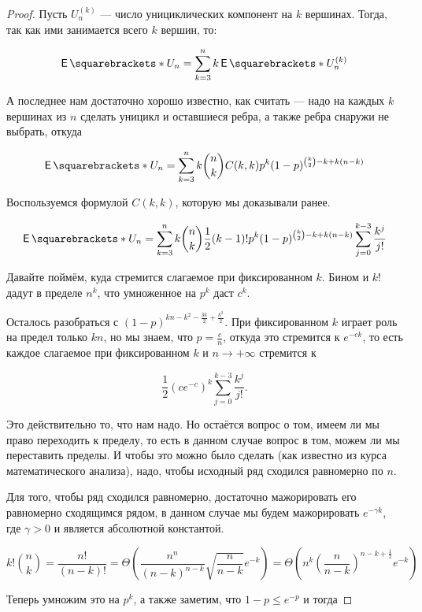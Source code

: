 \begin{proof}
  Пусть $U_n^{(k)}$ --- число унициклических компонент на $k$ вершинах. Тогда, так
  как ими занимается всего $k$ вершин, то:

  \[
    \E{U_n} = \sum\limits_{k = 3}^n k\E{U_n^{(k)}}
  \]

  А последнее нам достаточно хорошо известно, как считать --- надо на каждых
  $k$ вершинах из $n$ сделать уницикл и оставшиеся ребра, а также ребра снаружи не выбрать, откуда

  \[
    \E{U_n} = \sum\limits_{k = 3}^n k \binom{n}{k} C(k, k) p^{k} (1 - p)^{\binom{k}{2} - k + k(n - k)}
  \]

  Воспользуемся формулой $C(k, k)$, которую мы доказывали ранее.

  \[
    \E{U_n} = \sum\limits_{k = 3}^n  k \binom{n}{k} \frac12 (k - 1)! p^{k} 
    (1 - p)^{\binom{k}{2} - k + k(n - k)}
    \sum\limits_{j = 0}^{k - 3} \frac{k^j}{j!}
  \]

  Давайте поймём, куда стремится слагаемое при фиксированном $k$. Бином и
  $k!$ дадут в пределе $n^k$, что умноженное на $p^k$ даст $c^k$.

  Осталось разобраться с $(1 - p)^{kn - k^2 - \frac{3k}{2} + \frac{k^2}{2}}$. При
  фиксированном $k$ играет роль на предел только $kn$, но мы знаем, что 
  $p = \frac{c}{n}$, откуда это стремится к $e^{-ck}$, то есть каждое слагаемое
  при фиксированном $k$ и $n \to +\infty$ стремится к

  \[
    \frac12 (ce^{-c})^k \sum\limits_{j = 0}^{k - 3}\frac{k^j}{j!}.
  \]

  Это действительно то, что нам надо. Но остаётся вопрос о том, имеем ли мы право
  переходить к пределу, то есть в данном случае вопрос в том, можем ли мы
  переставить пределы. И чтобы это можно было сделать (как известно из курса
  математического анализа), надо, чтобы исходный ряд сходился равномерно по $n$.

  Для того, чтобы ряд сходился равномерно, достаточно мажорировать его
  равномерно сходящимся рядом, в данном случае мы будем мажорировать $e^{-\gamma k}$,
  где $\gamma > 0$ и является абсолютной константой.

  \[
    k! \binom{n}{k} = \frac{n!}{(n - k)!} = \Theta\left(\frac{n^n}{(n - k)^{n - k}}
    \sqrt{\frac{n}{n - k}} e^{-k}\right) = \Theta\left(n^k 
    \left(\frac{n}{n - k}\right)^{n - k + \frac12} e^{-k}\right)
  \]

  Теперь умножим это на $p^k$, а также заметим, что $1 - p \leq e^{-p}$ 
  и тогда


\end{proof}
